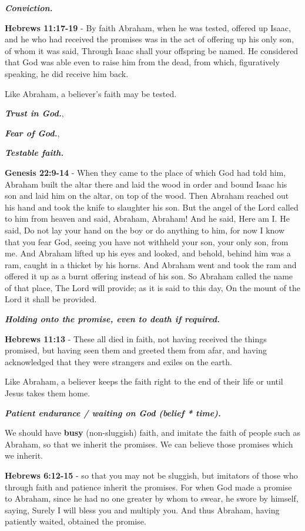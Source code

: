 \documentclass[11pt]{article}
\begin{document}
\emph{\textbf{Conviction.}}

\textbf{Hebrews 11:17-19} - By faith Abraham, when he was tested, offered up Isaac, and he who had received the promises was in the act of offering up his only son, of whom it was said, Through Isaac shall your offspring be named. He considered that God was able even to raise him from the dead, from which, figuratively speaking, he did receive him back.

Like Abraham, a believer's faith may be tested.

\emph{\textbf{Trust in God.}},

\emph{\textbf{Fear of God.}},

\emph{\textbf{Testable faith.}}

\textbf{Genesis 22:9-14} - When they came to the place of which God had told him, Abraham built the altar there and laid the wood in order and bound Isaac his son and laid him on the altar, on top of the wood. Then Abraham reached out his hand and took the knife to slaughter his son. But the angel of the Lord called to him from heaven and said, Abraham, Abraham! And he said, Here am I. He said, Do not lay your hand on the boy or do anything to him, for now I know that you fear God, seeing you have not withheld your son, your only son, from me. And Abraham lifted up his eyes and looked, and behold, behind him was a ram, caught in a thicket by his horns. And Abraham went and took the ram and offered it up as a burnt offering instead of his son. So Abraham called the name of that place, The Lord will provide; as it is said to this day, On the mount of the Lord it shall be provided.

\emph{\textbf{Holding onto the promise, even to death if required.}}

\textbf{Hebrews 11:13} - These all died in faith, not having received the things promised, but having seen them and greeted them from afar, and having acknowledged that they were strangers and exiles on the earth.

Like Abraham, a believer keeps the faith right to the end of their life or until Jesus takes them home.

\emph{\textbf{Patient endurance / waiting on God (belief * time).}}

We should have \textbf{busy} (non-sluggish) faith,
and imitate the faith of people such as
Abraham, so that we inherit the promises.
We can believe those promises which we inherit.

\textbf{Hebrews 6:12-15} - so that you may not be sluggish, but imitators of those who through faith and patience inherit the promises. For when God made a promise to Abraham, since he had no one greater by whom to swear, he swore by himself, saying, Surely I will bless you and multiply you. And thus Abraham, having patiently waited, obtained the promise.
\end{document}

